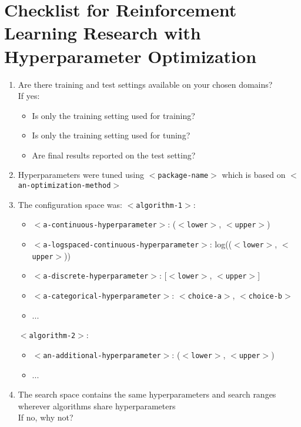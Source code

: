 \documentclass{article}
\newcommand{\cmark}{\ding{51}}%
\newcommand{\xmark}{\ding{55}}%
\begin{document}
\section*{Checklist for Reinforcement Learning Research with Hyperparameter Optimization}

\begin{enumerate}
    \itemsep0em 
    \item Are there training and test settings available on your chosen domains? \\ If yes:
    \begin{itemize}
        \item Is only the training setting used for training? \cmark \xmark
        \item Is only the training setting used for tuning? \cmark \xmark
        \item Are final results reported on the test setting? \cmark \xmark
    \end{itemize}
    \item Hyperparameters were tuned using \texttt{$<$package-name$>$} which is based on \texttt{$<$an-optimization-method$>$}
    \item The configuration space was:
    \texttt{$<$algorithm-1$>$}:
    \begin{itemize}
        \item \texttt{$<$a-continuous-hyperparameter$>$}: (\texttt{$<$lower$>$}, \texttt{$<$upper$>$})
        \item \texttt{$<$a-logspaced-continuous-hyperparameter$>$}: log((\texttt{$<$lower$>$}, \texttt{$<$upper$>$}))
        \item \texttt{$<$a-discrete-hyperparameter$>$}: [\texttt{$<$lower$>$}, \texttt{$<$upper$>$}]
        \item \texttt{$<$a-categorical-hyperparameter$>$}: {\texttt{$<$choice-a$>$}, \texttt{$<$choice-b$>$}}
        \item ...
    \end{itemize}
    \texttt{$<$algorithm-2$>$}:
    \begin{itemize}
        \item \texttt{$<$an-additional-hyperparameter$>$}: (\texttt{$<$lower$>$}, \texttt{$<$upper$>$})
        \item ...
    \end{itemize}
    \item The search space contains the same hyperparameters and search ranges wherever algorithms share hyperparameters \cmark \xmark \\ If no, why not?

\end{enumerate}
\end{document}
